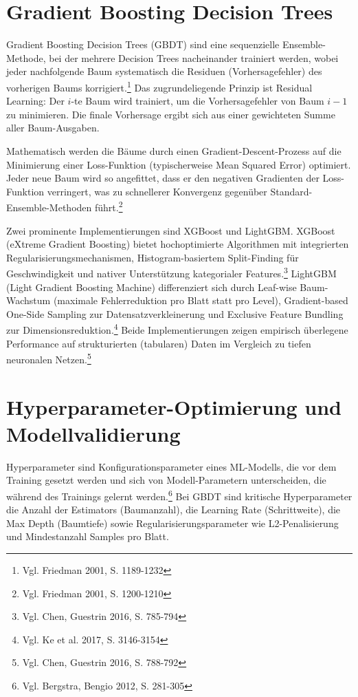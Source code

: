 \section{Gradient Boosting Decision Trees}

Gradient Boosting Decision Trees (GBDT) sind eine sequenzielle Ensemble-Methode, bei der mehrere Decision Trees nacheinander trainiert werden, wobei jeder nachfolgende Baum systematisch die Residuen (Vorhersagefehler) des vorherigen Baums korrigiert.\footnote{Vgl. Friedman 2001, S. 1189-1232} Das zugrundeliegende Prinzip ist Residual Learning: Der $i$-te Baum wird trainiert, um die Vorhersagefehler von Baum $i-1$ zu minimieren. Die finale Vorhersage ergibt sich aus einer gewichteten Summe aller Baum-Ausgaben.

Mathematisch werden die Bäume durch einen Gradient-Descent-Prozess auf die Minimierung einer Loss-Funktion (typischerweise Mean Squared Error) optimiert. Jeder neue Baum wird so angefittet, dass er den negativen Gradienten der Loss-Funktion verringert, was zu schnellerer Konvergenz gegenüber Standard-Ensemble-Methoden führt.\footnote{Vgl. Friedman 2001, S. 1200-1210}

Zwei prominente Implementierungen sind XGBoost und LightGBM. XGBoost (eXtreme Gradient Boosting) bietet hochoptimierte Algorithmen mit integrierten Regularisierungsmechanismen, Histogram-basiertem Split-Finding für Geschwindigkeit und nativer Unterstützung kategorialer Features.\footnote{Vgl. Chen, Guestrin 2016, S. 785-794} LightGBM (Light Gradient Boosting Machine) differenziert sich durch Leaf-wise Baum-Wachstum (maximale Fehlerreduktion pro Blatt statt pro Level), Gradient-based One-Side Sampling zur Datensatzverkleinerung und Exclusive Feature Bundling zur Dimensionsreduktion.\footnote{Vgl. Ke et al. 2017, S. 3146-3154} Beide Implementierungen zeigen empirisch überlegene Performance auf strukturierten (tabularen) Daten im Vergleich zu tiefen neuronalen Netzen.\footnote{Vgl. Chen, Guestrin 2016, S. 788-792}

\section{Hyperparameter-Optimierung und Modellvalidierung}

Hyperparameter sind Konfigurationsparameter eines ML-Modells, die vor dem Training gesetzt werden und sich von Modell-Parametern unterscheiden, die während des Trainings gelernt werden.\footnote{Vgl. Bergstra, Bengio 2012, S. 281-305} Bei GBDT sind kritische Hyperparameter die Anzahl der Estimators (Baumanzahl), die Learning Rate (Schrittweite), die Max Depth (Baumtiefe) sowie Regularisierungsparameter wie L2-Penalisierung und Mindestanzahl Samples pro Blatt.

